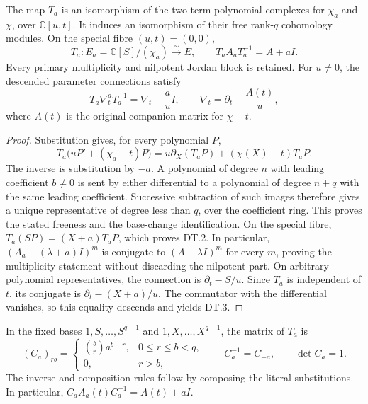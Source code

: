 \begin{proposition}
The map \(T_a\) is an isomorphism of the two-term polynomial complexes
for \(\chi_a\) and \(\chi\), over \(\mathbb C[u,t]\). It induces an
isomorphism of their free rank-\(q\) cohomology modules. On the special
fibre \((u,t)=(0,0)\),
\begin{equation}\tag{DT.2}
 T_a:E_a=\mathbb C[S]/(\chi_a)\xrightarrow{\sim}E,
 \qquad T_aA_aT_a^{-1}=A+aI.
\end{equation}
Every primary multiplicity and nilpotent Jordan block is retained.
For \(u\ne0\), the descended parameter connections satisfy
\begin{equation}\tag{DT.3}
 T_a\nabla_t^a T_a^{-1}=\nabla_t-\frac a u I,
 \qquad \nabla_t=\partial_t-\frac{A(t)}u,
\end{equation}
where \(A(t)\) is the original companion matrix for \(\chi-t\).
\end{proposition}
\begin{proof}
Substitution gives, for every polynomial \(P\),
\[
 T_a\bigl(uP'+(\chi_a-t)P\bigr)
   =u\partial_X(T_aP)+(\chi(X)-t)T_aP.
\]
The inverse is substitution by \(-a\). A polynomial of degree \(n\)
with leading coefficient \(b\ne0\) is sent by either differential to
a polynomial of degree \(n+q\) with the same leading coefficient.
Successive subtraction of such images therefore gives a unique
representative of degree less than \(q\), over the coefficient ring.
This proves the stated freeness and the base-change identification.
On the special fibre, \(T_a(SP)=(X+a)T_aP\), which proves DT.2.
In particular, \((A_a-(\lambda+a)I)^m\) is conjugate to
\((A-\lambda I)^m\) for every \(m\), proving the multiplicity statement
without discarding the nilpotent part. On arbitrary polynomial
representatives, the connection is \(\partial_t-S/u\). Since \(T_a\)
is independent of \(t\), its conjugate is
\(\partial_t-(X+a)/u\). The commutator with the differential vanishes,
so this equality descends and yields DT.3.
\end{proof}

In the fixed bases \(1,S,\ldots,S^{q-1}\) and
\(1,X,\ldots,X^{q-1}\), the matrix of \(T_a\) is
\begin{equation}\tag{DT.4}
 (C_a)_{rb}=\begin{cases}\binom br a^{b-r},&0\le r\le b<q,\\
                  0,&r>b,\end{cases}
 \qquad C_a^{-1}=C_{-a},\qquad \det C_a=1.
\end{equation}
The inverse and composition rules follow by composing the literal
substitutions. In particular,
\(C_aA_a(t)C_a^{-1}=A(t)+aI\).

